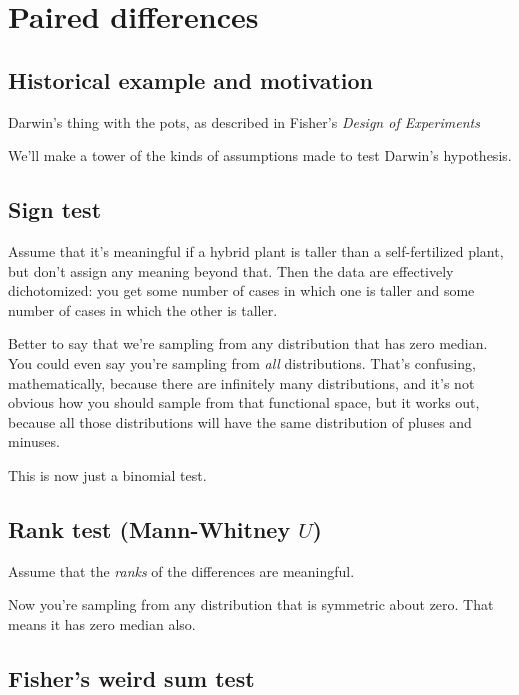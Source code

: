 \section{Paired differences}\label{paired-differences}

\subsection{Historical example and
motivation}\label{historical-example-and-motivation}

Darwin's thing with the pots, as described in Fisher's \emph{Design of
Experiments}

We'll make a tower of the kinds of assumptions made to test Darwin's
hypothesis.

\subsection{Sign test}\label{sign-test}

Assume that it's meaningful if a hybrid plant is taller than a
self-fertilized plant, but don't assign any meaning beyond that. Then
the data are effectively dichotomized: you get some number of cases in
which one is taller and some number of cases in which the other is
taller.

Better to say that we're sampling from any distribution that has zero
median. You could even say you're sampling from \emph{all}
distributions. That's confusing, mathematically, because there are
infinitely many distributions, and it's not obvious how you should
sample from that functional space, but it works out, because all those
distributions will have the same distribution of pluses and minuses.

This is now just a binomial test.

\subsection{Rank test (Mann-Whitney $U$)}

Assume that the \emph{ranks} of the differences are meaningful.

Now you're sampling from any distribution that is symmetric about zero.
That means it has zero median also.

\subsection{Fisher's weird sum test}\label{fishers-weird-sum-test}

